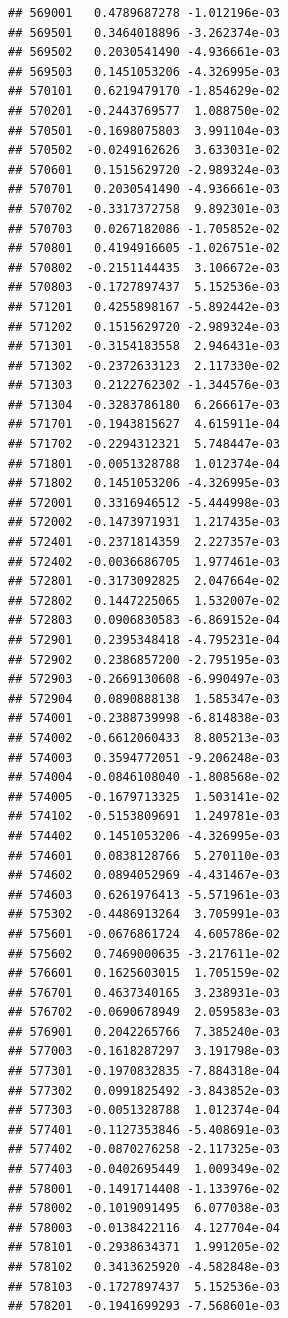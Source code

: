 \begin{frame}[fragile]
\begin{verbatim}
## 569001   0.4789687278 -1.012196e-03
## 569501   0.3464018896 -3.262374e-03
## 569502   0.2030541490 -4.936661e-03
## 569503   0.1451053206 -4.326995e-03
## 570101   0.6219479170 -1.854629e-02
## 570201  -0.2443769577  1.088750e-02
## 570501  -0.1698075803  3.991104e-03
## 570502  -0.0249162626  3.633031e-02
## 570601   0.1515629720 -2.989324e-03
## 570701   0.2030541490 -4.936661e-03
## 570702  -0.3317372758  9.892301e-03
## 570703   0.0267182086 -1.705852e-02
## 570801   0.4194916605 -1.026751e-02
## 570802  -0.2151144435  3.106672e-03
## 570803  -0.1727897437  5.152536e-03
## 571201   0.4255898167 -5.892442e-03
## 571202   0.1515629720 -2.989324e-03
## 571301  -0.3154183558  2.946431e-03
## 571302  -0.2372633123  2.117330e-02
## 571303   0.2122762302 -1.344576e-03
## 571304  -0.3283786180  6.266617e-03
## 571701  -0.1943815627  4.615911e-04
## 571702  -0.2294312321  5.748447e-03
## 571801  -0.0051328788  1.012374e-04
## 571802   0.1451053206 -4.326995e-03
## 572001   0.3316946512 -5.444998e-03
## 572002  -0.1473971931  1.217435e-03
## 572401  -0.2371814359  2.227357e-03
## 572402  -0.0036686705  1.977461e-03
## 572801  -0.3173092825  2.047664e-02
## 572802   0.1447225065  1.532007e-02
## 572803   0.0906830583 -6.869152e-04
## 572901   0.2395348418 -4.795231e-04
## 572902   0.2386857200 -2.795195e-03
## 572903  -0.2669130608 -6.990497e-03
## 572904   0.0890888138  1.585347e-03
## 574001  -0.2388739998 -6.814838e-03
## 574002  -0.6612060433  8.805213e-03
## 574003   0.3594772051 -9.206248e-03
## 574004  -0.0846108040 -1.808568e-02
## 574005  -0.1679713325  1.503141e-02
## 574102  -0.5153809691  1.249781e-03
## 574402   0.1451053206 -4.326995e-03
## 574601   0.0838128766  5.270110e-03
## 574602   0.0894052969 -4.431467e-03
## 574603   0.6261976413 -5.571961e-03
## 575302  -0.4486913264  3.705991e-03
## 575601  -0.0676861724  4.605786e-02
## 575602   0.7469000635 -3.217611e-02
## 576601   0.1625603015  1.705159e-02
## 576701   0.4637340165  3.238931e-03
## 576702  -0.0690678949  2.059583e-03
## 576901   0.2042265766  7.385240e-03
## 577003  -0.1618287297  3.191798e-03
## 577301  -0.1970832835 -7.884318e-04
## 577302   0.0991825492 -3.843852e-03
## 577303  -0.0051328788  1.012374e-04
## 577401  -0.1127353846 -5.408691e-03
## 577402  -0.0870276258 -2.117325e-03
## 577403  -0.0402695449  1.009349e-02
## 578001  -0.1491714408 -1.133976e-02
## 578002  -0.1019091495  6.077038e-03
## 578003  -0.0138422116  4.127704e-04
## 578101  -0.2938634371  1.991205e-02
## 578102   0.3413625920 -4.582848e-03
## 578103  -0.1727897437  5.152536e-03
## 578201  -0.1941699293 -7.568601e-03

\end{verbatim}
\end{frame}
